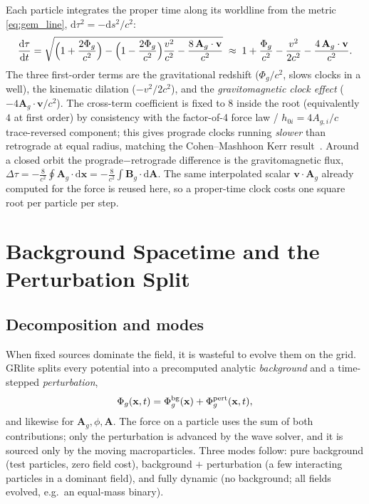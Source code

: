 \documentclass[11pt]{article}
\newcommand{\Phig}{\Phi_g}                 %
\newcommand{\Ag}{\mathbf{A}_g}             %
\newcommand{\vv}[1]{\mathbf{#1}}           %
\newcommand{\dd}{\mathrm{d}}               %
\newcommand{\Bg}{\vv{B}_g}
\begin{document}
Each particle integrates the proper time along its worldline from the metric
\eqref{eq:gem_line}, $\dd\tau^2=-\dd s^2/c^2$:
\begin{equation}
\label{eq:proper_time}
  \frac{\dd\tau}{\dd t} = \sqrt{\Bigl(1+\frac{2\Phig}{c^2}\Bigr)
     - \Bigl(1-\frac{2\Phig}{c^2}\Bigr)\frac{v^2}{c^2}
     - \frac{8\,\Ag\cdot\vv{v}}{c^2}}
  \;\approx\; 1 + \frac{\Phig}{c^2} - \frac{v^2}{2c^2} - \frac{4\,\Ag\cdot\vv{v}}{c^2}.
\end{equation}
The three first-order terms are the gravitational redshift ($\Phig/c^2$, slows
clocks in a well), the kinematic dilation ($-v^2/2c^2$), and the
\emph{gravitomagnetic clock effect} ($-4\Ag\cdot\vv{v}/c^2$).  The cross-term
coefficient is fixed to $8$ inside the root (equivalently $4$ at first order) by
consistency with the factor-of-4 force law / $h_{0i}=4A_{g,i}/c$ trace-reversed
component; this gives prograde clocks running \emph{slower} than retrograde at
equal radius, matching the Cohen--Mashhoon Kerr
result~\cite{CohenMashhoon1993,Mashhoon2003}. Around a closed orbit the
prograde$-$retrograde difference is the gravitomagnetic flux,
$\Delta\tau = -\tfrac{8}{c^2}\oint\Ag\cdot\dd\vv{x} =
-\tfrac{8}{c^2}\!\int\Bg\cdot\dd\vv{A}$.
The same interpolated scalar $\vv{v}\cdot\Ag$ already computed for the force is
reused here, so a proper-time clock costs one square root per particle per step.

\section{Background Spacetime and the Perturbation Split}
\label{sec:bgsplit}

\subsection{Decomposition and modes}

When fixed sources dominate the field, it is wasteful to evolve them on the grid.
GRlite splits every potential into a precomputed analytic \emph{background} and a
time-stepped \emph{perturbation},
\begin{equation}
  \Phig(\vv{x},t)=\Phig^{\rm bg}(\vv{x})+\Phig^{\rm pert}(\vv{x},t),
\end{equation}
and likewise for $\Ag,\phi,\vv{A}$.  The force on a particle uses the sum of
both contributions; only the perturbation is advanced by the wave solver, and it
is sourced only by the moving macroparticles.  Three modes follow: pure
background (test particles, zero field cost), background $+$ perturbation (a few
interacting particles in a dominant field), and fully dynamic (no background; all
fields evolved, e.g.\ an equal-mass binary).
\end{document}
